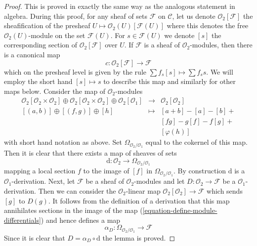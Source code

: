 \begin{proof}
This is proved in exactly the same way as the analogous statement in algebra.
During this proof, for any sheaf of sets $\mathcal{F}$ on $\mathcal{C}$,
let us denote $\mathcal{O}_2[\mathcal{F}]$ the sheafification of the
presheaf $U \mapsto \mathcal{O}_2(U)[\mathcal{F}(U)]$ where this denotes
the free $\mathcal{O}_2(U)$-module on the set $\mathcal{F}(U)$.
For $s \in \mathcal{F}(U)$ we denote $[s]$ the corresponding section
of $\mathcal{O}_2[\mathcal{F}]$ over $U$. If $\mathcal{F}$ is a sheaf of
$\mathcal{O}_2$-modules, then there is a canonical map
$$
c : \mathcal{O}_2[\mathcal{F}] \longrightarrow \mathcal{F}
$$
which on the presheaf level is given by the rule
$\sum f_s[s] \mapsto \sum f_s s$. We will employ the short hand
$[s] \mapsto s$ to
describe this map and similarly for other maps below. Consider
the map of $\mathcal{O}_2$-modules
\begin{equation}
\label{equation-define-module-differentials}
\begin{matrix}
\mathcal{O}_2[\mathcal{O}_2 \times \mathcal{O}_2] \oplus
\mathcal{O}_2[\mathcal{O}_2 \times \mathcal{O}_2] \oplus
\mathcal{O}_2[\mathcal{O}_1] &
\longrightarrow &
\mathcal{O}_2[\mathcal{O}_2] \\
[(a, b)] \oplus [(f, g)] \oplus [h] & \longmapsto & [a + b] - [a] - [b] + \\
& & [fg] - g[f] - f[g] + \\
& & [\varphi(h)]
\end{matrix}
\end{equation}
with short hand notation as above. Set $\Omega_{\mathcal{O}_2/\mathcal{O}_1}$
equal to the cokernel of this map. Then it is clear that there exists
a map of sheaves of sets
$$
\text{d} : \mathcal{O}_2 \longrightarrow \Omega_{\mathcal{O}_2/\mathcal{O}_1}
$$
mapping a local section $f$ to the image of $[f]$ in
$\Omega_{\mathcal{O}_2/\mathcal{O}_1}$. By construction $\text{d}$
is a $\mathcal{O}_1$-derivation. Next, let $\mathcal{F}$
be a sheaf of $\mathcal{O}_2$-modules and let
$D : \mathcal{O}_2 \to \mathcal{F}$ be a $\mathcal{O}_1$-derivation.
Then we can consider the $\mathcal{O}_2$-linear map
$\mathcal{O}_2[\mathcal{O}_2] \to \mathcal{F}$ which sends $[g]$ to $D(g)$.
It follows from the definition of a derivation that this map annihilates
sections in the image of the map (\ref{equation-define-module-differentials})
and hence defines a map
$$
\alpha_D : \Omega_{\mathcal{O}_2/\mathcal{O}_1} \longrightarrow \mathcal{F}
$$
Since it is clear that $D = \alpha_D \circ \text{d}$ the lemma is proved.
\end{proof}

